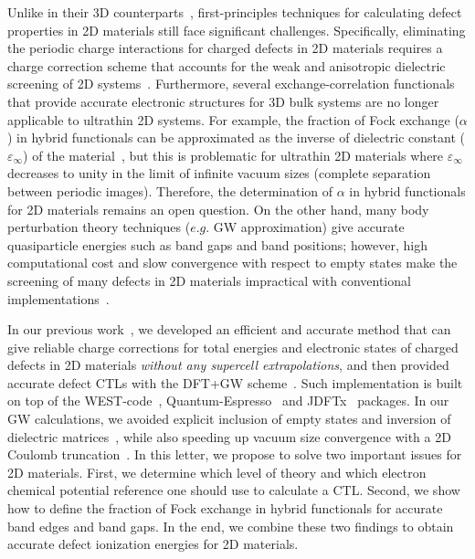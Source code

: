 Unlike in their 3D counterparts~\cite{freysoldt2009fully,freysoldt2014first,vinichenko2017accurate,kumagai2014electrostatics,komsa2013finite}, first-principles techniques for calculating defect properties in 2D materials still face significant challenges.  Specifically, eliminating the periodic charge interactions for charged defects in 2D materials requires a charge correction scheme that accounts for the weak and anisotropic dielectric screening of 2D systems~\cite{komsa2014charged,komsa2018erratum,wang2015determination}. Furthermore, several exchange-correlation functionals that provide accurate electronic structures for 3D bulk systems are no longer applicable to ultrathin 2D systems.
For example, the fraction of Fock exchange ($\alpha$) in hybrid functionals can be approximated as the inverse of dielectric constant ($\varepsilon_{\infty}$) of the material~\cite{alkauskas2011defect,skone2014self}, but this is problematic for ultrathin 2D materials where $\varepsilon_{\infty}$  decreases to unity in the limit of infinite vacuum sizes (complete separation between periodic images). Therefore, the determination of $\alpha$ in hybrid functionals for 2D materials remains an open question. On the other hand, many body perturbation theory techniques ($\textit{e.g.}$ GW approximation) give accurate quasiparticle energies such as band gaps and band positions; however, high computational cost and slow convergence with respect to empty states make the screening of many defects in 2D materials impractical with conventional implementations~\cite{qiu2016screening,rasmussen2016efficient,thygesen2017calculating,huser2013quasiparticle,attaccalite2011coupling,felipe2017nonuniform}.

In our previous work~\cite{wu2017first,PING2017JCP}, we developed an efficient and accurate method that can give reliable charge corrections for total energies and electronic states of charged defects in 2D materials \textit{without any supercell extrapolations}, and then provided accurate defect CTLs with the DFT+GW scheme~\cite{malashevich2014first,chen2013correspondence,chen2015first,chen2017accuracy}. Such implementation is built on top of the WEST-code~\cite{govoni2015large}, Quantum-Espresso~\cite{QE1} and JDFTx~\cite{JDFTx} packages. In our GW calculations, we avoided explicit inclusion of empty states and inversion of dielectric matrices~\cite{govoni2015large,ping20132electronic,pham2013gw}, while also speeding up vacuum size convergence with a 2D Coulomb truncation~\cite{ismail2000new}. In this letter, we propose to solve two important issues for 2D materials. First, we determine which level of theory and which electron chemical potential reference one should use to calculate a CTL. Second, we show how to define the fraction of Fock exchange in hybrid functionals for accurate band edges and band gaps. In the end, we combine these two findings to obtain accurate defect ionization energies for 2D materials.

